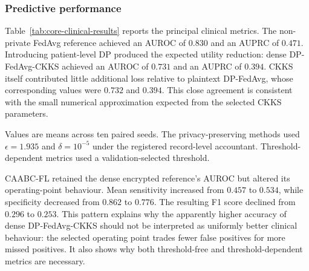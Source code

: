 \subsubsection{Predictive performance}

Table~\ref{tab:core-clinical-results} reports the principal clinical metrics. The non-private FedAvg reference achieved an AUROC of $0.830$ and an AUPRC of $0.471$. Introducing patient-level DP produced the expected utility reduction: dense DP-FedAvg-CKKS achieved an AUROC of $0.731$ and an AUPRC of $0.394$. CKKS itself contributed little additional loss relative to plaintext DP-FedAvg, whose corresponding values were $0.732$ and $0.394$. This close agreement is consistent with the small numerical approximation expected from the selected CKKS parameters.

\begin{table}[htbp]
    \centering
    \caption{Core clinical performance on the frozen PhysioNet test partition}
    \label{tab:core-clinical-results}
    \vspace{1mm}

    \footnotesize Values are means across ten paired seeds. The privacy-preserving methods used $\epsilon=1.935$ and $\delta=10^{-5}$ under the registered record-level accountant. Threshold-dependent metrics used a validation-selected threshold.
\end{table}

CAABC-FL retained the dense encrypted reference's AUROC but altered its operating-point behaviour. Mean sensitivity increased from $0.457$ to $0.534$, while specificity decreased from $0.862$ to $0.776$. The resulting F1 score declined from $0.296$ to $0.253$. This pattern explains why the apparently higher accuracy of dense DP-FedAvg-CKKS should not be interpreted as uniformly better clinical behaviour: the selected operating point trades fewer false positives for more missed positives. It also shows why both threshold-free and threshold-dependent metrics are necessary.

